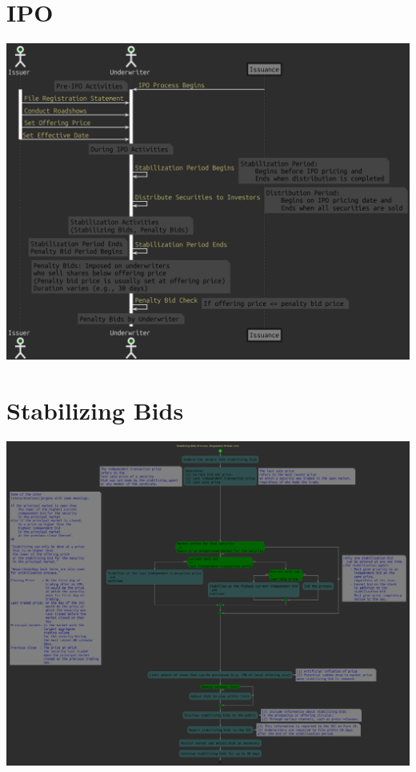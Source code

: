 \documentclass[11pt]{article}
\begin{document}
\section{IPO}
\label{sec:orgc48e52d}
\begin{center}
\includegraphics[width=.9\linewidth]{./IPO_period.png}
\end{center}

\section{Stabilizing Bids}
\label{sec:orgacad212}
\begin{center}
\includegraphics[width=.9\linewidth]{./stabilizing-bids.png}
\end{center}
\end{document}

